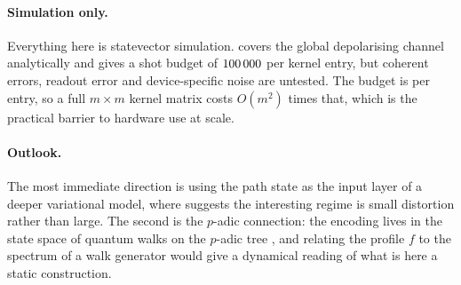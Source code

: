 \paragraph{Simulation only.}
Everything here is statevector simulation.  covers the global
depolarising channel analytically and  gives a shot budget of
$100\,000$ per kernel entry, but coherent errors, readout error and device-specific
noise are untested. The budget is per entry, so a full $m \times m$ kernel matrix costs
$O(m^{2})$ times that, which is the practical barrier to hardware use at scale.

\paragraph{Outlook.}
The most immediate direction is using the path state as the input layer of a deeper
variational model, where  suggests the interesting regime is small
distortion rather than large. The second is the $p$-adic connection: the encoding lives
in the state space of quantum walks on the $p$-adic tree
\citep{ZunigaGalindo2024QuantumWalks}, and relating the profile $f$ to the spectrum of a
walk generator would give a dynamical reading of what is here a static construction.
